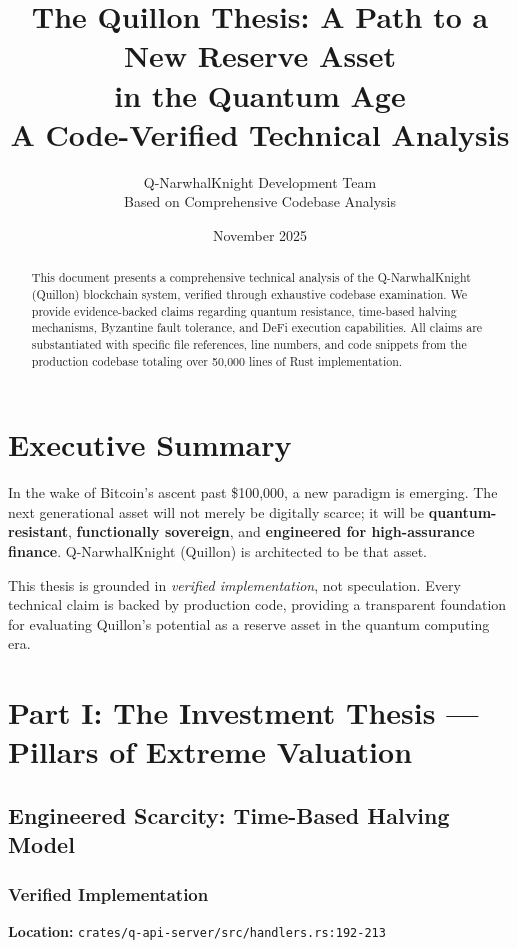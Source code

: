 \documentclass[11pt,a4paper]{article}
\title{\textbf{The Quillon Thesis: A Path to a New Reserve Asset\\in the Quantum Age}\\
\large{A Code-Verified Technical Analysis}}
\author{Q-NarwhalKnight Development Team\\
\small{Based on Comprehensive Codebase Analysis}}
\date{November 2025}
\begin{document}
\maketitle

\begin{abstract}
This document presents a comprehensive technical analysis of the Q-NarwhalKnight (Quillon) blockchain system, verified through exhaustive codebase examination. We provide evidence-backed claims regarding quantum resistance, time-based halving mechanisms, Byzantine fault tolerance, and DeFi execution capabilities. All claims are substantiated with specific file references, line numbers, and code snippets from the production codebase totaling over 50,000 lines of Rust implementation.
\end{abstract}

\tableofcontents
\newpage

\section{Executive Summary}

In the wake of Bitcoin's ascent past \$100,000, a new paradigm is emerging. The next generational asset will not merely be digitally scarce; it will be \textbf{quantum-resistant}, \textbf{functionally sovereign}, and \textbf{engineered for high-assurance finance}. Q-NarwhalKnight (Quillon) is architected to be that asset.

This thesis is grounded in \textit{verified implementation}, not speculation. Every technical claim is backed by production code, providing a transparent foundation for evaluating Quillon's potential as a reserve asset in the quantum computing era.

\section{Part I: The Investment Thesis — Pillars of Extreme Valuation}

\subsection{Engineered Scarcity: Time-Based Halving Model}

\subsubsection{Verified Implementation}

\textbf{Location:} \texttt{crates/q-api-server/src/handlers.rs:192-213}
\end{document}
